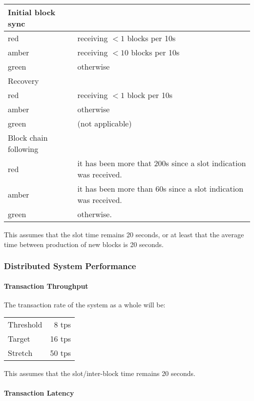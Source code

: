 \documentclass{report}
\theoremstyle{definition}{
  \newtheorem{lemma}{Lemma}[section] %
  \newtheorem{definition}[lemma]{Definition}
}
\theoremstyle{theorem}{
  \newtheorem{invariant}[lemma]{Invariant}
  \newtheorem{proofobligation}[lemma]{Proof Obligation}
}
\numberwithin{equation}{lemma}
\begin{document}
%
\begin{center}
\begin{tabular}{ll}
Initial block sync \\
\hline
red   & receiving $<1$ blocks per 10s \\
amber & receiving $<10$ blocks per 10s \\
green & otherwise  \\[1em]

Recovery \\
\hline
red   & receiving $<1$ block per 10s \\
amber & otherwise  \\
green & (not applicable) \\[1em]

Block chain following \\
\hline
red   & it has been more that 200s since a slot indication was received. \\
amber & it has been more than 60s since a slot indication was received. \\
green & otherwise.
\end{tabular}
\end{center}

This assumes that the slot time remains 20 seconds, or at least that the average time
between production of new blocks is 20 seconds.


\subsubsection{Distributed System Performance}

\paragraph{Transaction Throughput}

The transaction rate of the system as a whole will be:
%
\begin{center}
\begin{tabular}{lr}
Threshold &  8 tps  \\
Target    & 16 tps  \\
Stretch   & 50 tps  \\
\end{tabular}
\end{center}

This assumes that the slot/inter-block time remains 20 seconds.

\paragraph{Transaction Latency}
\end{document}
